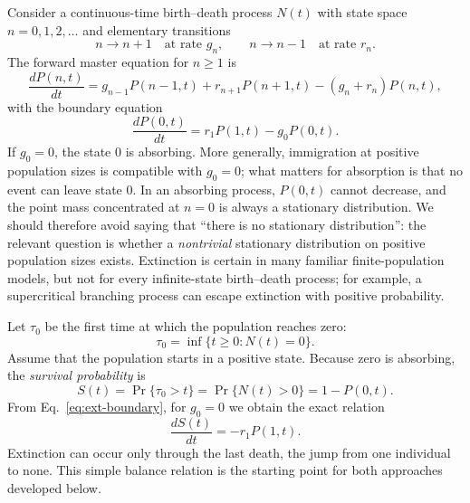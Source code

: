 Consider a continuous-time birth--death process $N(t)$ with state space
$n=0,1,2,\ldots$ and elementary transitions
\begin{equation}
 n\longrightarrow n+1\quad\text{at rate }g_n,\qquad
 n\longrightarrow n-1\quad\text{at rate }r_n.
 \label{eq:ext-transition-rates}
\end{equation}
The forward master equation for $n\geq 1$ is
\begin{equation}
 \frac{dP(n,t)}{dt}=
 g_{n-1}P(n-1,t)+r_{n+1}P(n+1,t)
 -(g_n+r_n)P(n,t),
 \label{eq:ext-forward}
\end{equation}
with the boundary equation
\begin{equation}
 \frac{dP(0,t)}{dt}=r_1P(1,t)-g_0P(0,t).
 \label{eq:ext-boundary}
\end{equation}
If $g_0=0$, the state $0$ is absorbing. More generally, immigration at
positive population sizes is compatible with $g_0=0$; what matters for
absorption is that no event can leave state $0$. In an absorbing process,
$P(0,t)$ cannot decrease, and the point mass concentrated at $n=0$ is
always a stationary distribution. We should therefore avoid saying that
``there is no stationary distribution'': the relevant question is whether a
\emph{nontrivial} stationary distribution on positive population sizes
exists. Extinction is certain in many familiar finite-population models,
but not for every infinite-state birth--death process; for example, a
supercritical branching process can escape extinction with positive
probability.

Let $\tau_0$ be the first time at which the population reaches zero:
\begin{equation}
 \tau_0=\inf\{t\geq0:N(t)=0\}.
 \label{eq:ext-hitting-def}
\end{equation}
Assume that the population starts in a positive state. Because zero is
absorbing, the \emph{survival probability} is
\begin{equation}
 S(t)=\Pr\{\tau_0>t\}=\Pr\{N(t)>0\}=1-P(0,t).
 \label{eq:ext-survival}
\end{equation}
From Eq.~\eqref{eq:ext-boundary}, for $g_0=0$ we obtain the exact relation
\begin{equation}
 \boxed{\frac{dS(t)}{dt}=-r_1P(1,t).}
 \label{eq:ext-survival-flux}
\end{equation}
Extinction can occur only through the last death, the jump from one
individual to none. This simple balance relation is the starting point
for both approaches developed below.

